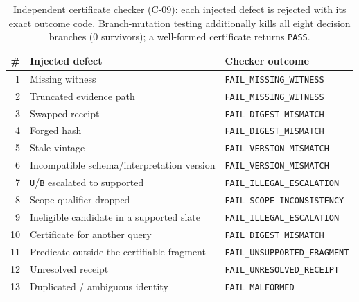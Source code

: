 \begin{table}[t]
\centering
\caption{Independent certificate checker (C-09): each injected defect is rejected with its exact
outcome code. Branch-mutation testing additionally kills all eight decision branches (0 survivors);
a well-formed certificate returns \texttt{PASS}.}
\label{tab:checker}
\begin{tabular}{@{}rll@{}}
\toprule
\# & Injected defect & Checker outcome \\
\midrule
1 & Missing witness & \texttt{FAIL\_MISSING\_WITNESS} \\
2 & Truncated evidence path & \texttt{FAIL\_MISSING\_WITNESS} \\
3 & Swapped receipt & \texttt{FAIL\_DIGEST\_MISMATCH} \\
4 & Forged hash & \texttt{FAIL\_DIGEST\_MISMATCH} \\
5 & Stale vintage & \texttt{FAIL\_VERSION\_MISMATCH} \\
6 & Incompatible schema/interpretation version & \texttt{FAIL\_VERSION\_MISMATCH} \\
7 & \texttt{U}/\texttt{B} escalated to supported & \texttt{FAIL\_ILLEGAL\_ESCALATION} \\
8 & Scope qualifier dropped & \texttt{FAIL\_SCOPE\_INCONSISTENCY} \\
9 & Ineligible candidate in a supported slate & \texttt{FAIL\_ILLEGAL\_ESCALATION} \\
10 & Certificate for another query & \texttt{FAIL\_DIGEST\_MISMATCH} \\
11 & Predicate outside the certifiable fragment & \texttt{FAIL\_UNSUPPORTED\_FRAGMENT} \\
12 & Unresolved receipt & \texttt{FAIL\_UNRESOLVED\_RECEIPT} \\
13 & Duplicated / ambiguous identity & \texttt{FAIL\_MALFORMED} \\
\bottomrule
\end{tabular}
\end{table}


